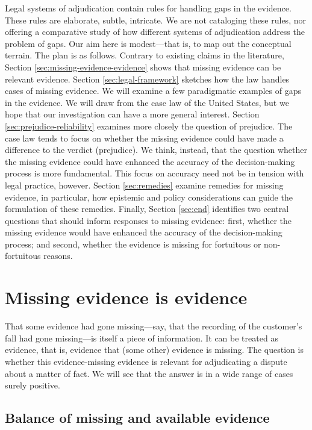 \documentclass[
  10pt,
  dvipsnames,enabledeprecatedfontcommands]{scrartcl}
\begin{document}
Legal systems of adjudication contain rules for handling gaps in the
evidence. These rules are elaborate, subtle, intricate. We are not
cataloging these rules, nor offering a comparative study of how
different systems of adjudication address the problem of gaps. Our aim
here is modest---that is, to map out the conceptual terrain. The plan is
as follows. Contrary to existing claims in the literature, Section
\ref{sec:missing-evidence-evidence} shows that missing evidence can be
relevant evidence. Section \ref{sec:legal-framework} sketches how the
law handles cases of missing evidence. We will examine a few
paradigmatic examples of gaps in the evidence. We will draw from the
case law of the United States, but we hope that our investigation can
have a more general interest. Section \ref{sec:prejudice-reliability}
examines more closely the question of prejudice. The case law tends to
focus on whether the missing evidence could have made a difference to
the verdict (prejudice). We think, instead, that the question whether
the missing evidence could have enhanced the accuracy of the
decision-making process is more fundamental. This focus on accuracy need
not be in tension with legal practice, however. Section
\ref{sec:remedies} examine remedies for missing evidence, in particular,
how epistemic and policy considerations can guide the formulation of
these remedies. Finally, Section \ref{sec:end} identifies two central
questions that should inform responses to missing evidence: first,
whether the missing evidence would have enhanced the accuracy of the
decision-making process; and second, whether the evidence is missing for
fortuitous or non-fortuitous reasons.

\hypertarget{missing-evidence-is-evidence}{%
\section{Missing evidence is
evidence}\label{missing-evidence-is-evidence}}

\label{sec:missing-evidence-evidence}

That some evidence had gone missing---say, that the recording of the
customer's fall had gone missing---is itself a piece of information. It
can be treated as evidence, that is, evidence that (some other) evidence
is missing. The question is whether this evidence-missing evidence is
relevant for adjudicating a dispute about a matter of fact. We will see
that the answer is in a wide range of cases surely positive.

\hypertarget{balance-of-missing-and-available-evidence}{%
\subsection{Balance of missing and available
evidence}\label{balance-of-missing-and-available-evidence}}
\end{document}
